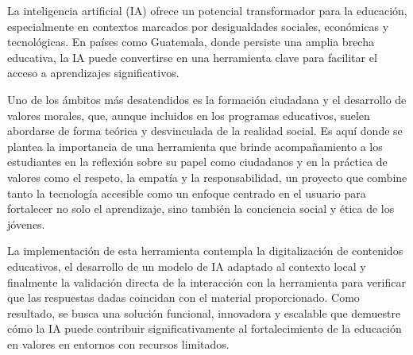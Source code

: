 La inteligencia artificial (IA) ofrece un potencial transformador para la educación, especialmente en contextos marcados por desigualdades sociales, económicas y tecnológicas. En países como Guatemala, donde persiste una amplia brecha educativa, la IA puede convertirse en una herramienta clave para facilitar el acceso a aprendizajes significativos.

Uno de los ámbitos más desatendidos es la formación ciudadana y el desarrollo de valores morales, que, aunque incluidos en los programas educativos, suelen abordarse de forma teórica y desvinculada de la realidad social. Es aquí donde se plantea la importancia de una herramienta que brinde acompañamiento a los estudiantes en la reflexión sobre su papel como ciudadanos y en la práctica de valores como el respeto, la empatía y la responsabilidad, un proyecto que combine tanto la tecnología accesible como un enfoque centrado en el usuario para fortalecer no solo el aprendizaje, sino también la conciencia social y ética de los jóvenes.

La implementación de esta herramienta contempla la digitalización de contenidos educativos, el desarrollo de un modelo de IA adaptado al contexto local y finalmente la validación directa
de la interacción con la herramienta para verificar que las respuestas dadas coincidan con el material proporcionado. Como resultado, se busca una solución funcional, innovadora y escalable que demuestre cómo la IA puede contribuir significativamente al fortalecimiento de la educación en valores en entornos con recursos limitados.